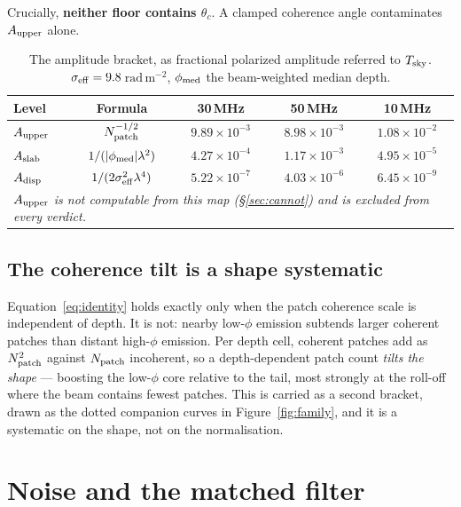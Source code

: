 \documentclass[11pt]{article}
\newcommand{\rmu}{\ensuremath{\mathrm{rad\,m^{-2}}}}
\newcommand{\lamsq}{\ensuremath{\lambda^{2}}}
\begin{document}
Crucially, \textbf{neither floor contains $\theta_c$}. A clamped
coherence angle contaminates $A_{\rm upper}$ alone.

\begin{table}[htbp]
  \centering
  \caption{The amplitude bracket, as fractional polarized amplitude
  referred to $T_{\rm sky}$. $\sigma_{\rm eff} = 9.8$\,\rmu,
  $\phi_{\rm med}$ the beam-weighted median depth.}
  \label{tab:bracket}
  \begin{tabular}{lcccc}
    \toprule
    Level & Formula & 30\,MHz & 50\,MHz & 10\,MHz \\
    \midrule
    $A_{\rm upper}$ & $N_{\rm patch}^{-1/2}$
      & $9.89\times10^{-3}$ & $8.98\times10^{-3}$ & $1.08\times10^{-2}$ \\
    $A_{\rm slab}$ & $1/(|\phi_{\rm med}|\lamsq)$
      & $4.27\times10^{-4}$ & $1.17\times10^{-3}$ & $4.95\times10^{-5}$ \\
    $A_{\rm disp}$ & $1/(2\sigma_{\rm eff}^2\lambda^4)$
      & $5.22\times10^{-7}$ & $4.03\times10^{-6}$ & $6.45\times10^{-9}$ \\
    \midrule
    \multicolumn{5}{l}{\emph{$A_{\rm upper}$ is not computable from this
    map (\S\ref{sec:cannot}) and is excluded from every verdict.}}\\
    \bottomrule
  \end{tabular}
\end{table}

\subsection{The coherence tilt is a shape systematic}

Equation~\eqref{eq:identity} holds exactly only when the patch coherence
scale is independent of depth. It is not: nearby low-$\phi$ emission
subtends larger coherent patches than distant high-$\phi$ emission. Per
depth cell, coherent patches add as $N_{\rm patch}^2$ against
$N_{\rm patch}$ incoherent, so a depth-dependent patch count \emph{tilts
the shape} --- boosting the low-$\phi$ core relative to the tail, most
strongly at the roll-off where the beam contains fewest patches. This is
carried as a second bracket, drawn as the dotted companion curves in
Figure~\ref{fig:family}, and it is a systematic on the shape, not on the
normalisation.

\section{Noise and the matched filter}
\label{sec:noise}
\end{document}
